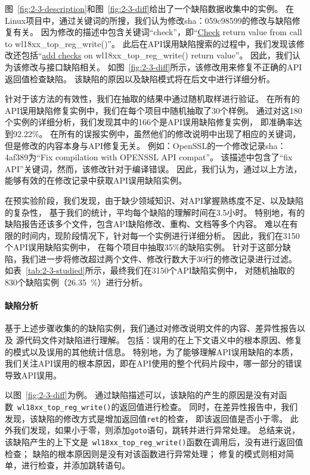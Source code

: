 图~\ref{fig:2-3-description}和图~\ref{fig:2-3-diff}给出了一个缺陷数据收集中的实例。
在Linux项目中，通过关键词的所搜，我们认为修改sha：059c98599的修改与缺陷修复有关。
因为修改的描述中包含关键词“check”，即“\underline{Check} return value from call to wl18xx\_top\_reg\_write()”。
此后在API误用缺陷搜索的过程中，我们发现该修改还包括“\underline{add checks} on wl18xx\_top\_reg\_write() return value”。
因此，我们认为该修改与接口缺陷相关。
如图~\ref{fig:2-3-diff}所示，该修改用来修复不正确的API返回值检查缺陷。
该缺陷的原因以及缺陷模式将在后文中进行详细分析。

针对于该方法的有效性，我们在抽取的结果中通过随机取样进行验证。
在所有的API误用缺陷修复实例中，我们在每个项目中随机抽取了30个样例。
通过对这180个实例的详细分析，我们发现其中的166个是API误用缺陷修复实例，
即准确率达到92.22\%。
在所有的误报实例中，虽然他们的修改说明中出现了相应的关键词，
但是修改的内容本身与API修复无关。
例如：OpenSSL的一个修改记录sha：4af389为“Fix compilation with OPENSSL API compat”。
该描述中包含了“fix API”关键词，然而，该修改针对于编译错误。
因此，我们认为，通过以上方法，能够有效的在修改记录中获取API误用缺陷实例。



在预实验阶段，我们发现，由于缺少领域知识、对API掌握熟练度不足、以及缺陷的复杂性，
基于我们的统计，平均每个缺陷的理解时间在3.5小时。
特别地，有的缺陷报告还该多个文件，包含API缺陷修改、重构、文档等多个内容。
难以在有限的时间内，现阶段情况下，针对每一个实例进行详细分析。
因此，我们在3150个API误用缺陷实例中，
在每个项目中抽取35\%的缺陷实例。
针对于这部分缺陷，我们进一步将修改超过两个文件、修改行数大于30行的修改记录进行过滤。
如表~\ref{tab:2-3-studied}所示，最终我们在3150个API缺陷实例中，
对随机抽取的830个缺陷实例（26.35~\%）进行分析。

\paragraph{缺陷分析}
基于上述步骤收集的的缺陷实例，我们通过对修改说明文件的内容、差异性报告以及
源代码文件对缺陷进行理解。
包括：误用的在上下文语义中的根本原因、修复的模式以及误用的其他统计信息。
特别地，为了能够理解API误用缺陷的本质，
我们关注API误用的根本原因，即在API使用的整个代码片段中，哪一部分的错误导致API误用。

以图~\ref{fig:2-3-diff}为例。
通过缺陷描述可以，该缺陷的产生的原因是没有对函数~\texttt{wl18xx\_top\_reg\_write()}的返回值进行检查。
同时，在差异性报告中，我们发现，该缺陷的修改方式是增加返回值\texttt{ret}的检查，
即该返回值是否小于零。
此外我们发现，如果小于零，则添加\texttt{goto}语句，跳转并进行异常处理。
总结来说，该缺陷产生的上下文是~\texttt{wl18xx\_top\_reg\_write()}函数在调用后，没有进行返回值检查；
缺陷的根本原因则是没有对该函数进行异常处理；
修复的模式则相对简单，进行检查，并添加跳转语句。

